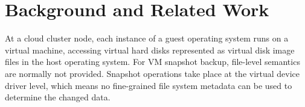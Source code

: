 
\section{Background and Related Work}
\label{sect:background}


At a cloud cluster node, each instance of a guest operating system runs on a virtual machine, accessing virtual hard disks 
represented as virtual disk image files in the host operating system.
For VM snapshot backup, file-level semantics are normally not provided.
Snapshot operations take place at the virtual device driver level, which
means no fine-grained file system metadata can be used to determine the changed data. 



